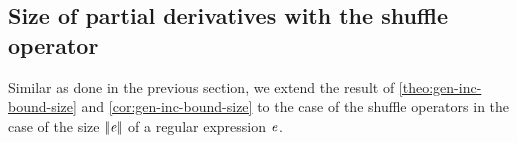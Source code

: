 


\subsection{Size of partial derivatives with the shuffle operator}

Similar as done in the previous section, we extend the result of \cref{theo:gen-inc-bound-size} and \cref{cor:gen-inc-bound-size} to the case of the shuffle operators in the case of the size ${{\mid\!\mid}}{\mathit {e}}{{\mid\!\mid}}$ of a regular expression $\mathit {e}$.

